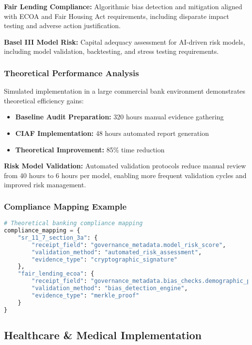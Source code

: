 \documentclass[12pt,a4paper]{article}
\begin{document}
\textbf{Fair Lending Compliance:} Algorithmic bias detection and mitigation aligned with ECOA and Fair Housing Act requirements, including disparate impact testing and adverse action justification.

\textbf{Basel III Model Risk:} Capital adequacy assessment for AI-driven risk models, including model validation, backtesting, and stress testing requirements.

\subsubsection{Theoretical Performance Analysis}

Simulated implementation in a large commercial bank environment demonstrates theoretical efficiency gains:

\begin{itemize}
\item \textbf{Baseline Audit Preparation:} 320 hours manual evidence gathering
\item \textbf{CIAF Implementation:} 48 hours automated report generation
\item \textbf{Theoretical Improvement:} 85\% time reduction
\end{itemize}

\textbf{Risk Model Validation:} Automated validation protocols reduce manual review from 40 hours to 6 hours per model, enabling more frequent validation cycles and improved risk management.

\subsubsection{Compliance Mapping Example}

\begin{lstlisting}[language=Python, caption=Banking Compliance Mapping]
# Theoretical banking compliance mapping
compliance_mapping = {
    "sr_11_7_section_3a": {
        "receipt_field": "governance_metadata.model_risk_score",
        "validation_method": "automated_risk_assessment",
        "evidence_type": "cryptographic_signature"
    },
    "fair_lending_ecoa": {
        "receipt_field": "governance_metadata.bias_checks.demographic_parity",
        "validation_method": "bias_detection_engine",
        "evidence_type": "merkle_proof"
    }
}
\end{lstlisting}

\subsection{Healthcare \& Medical Implementation}
\end{document}
